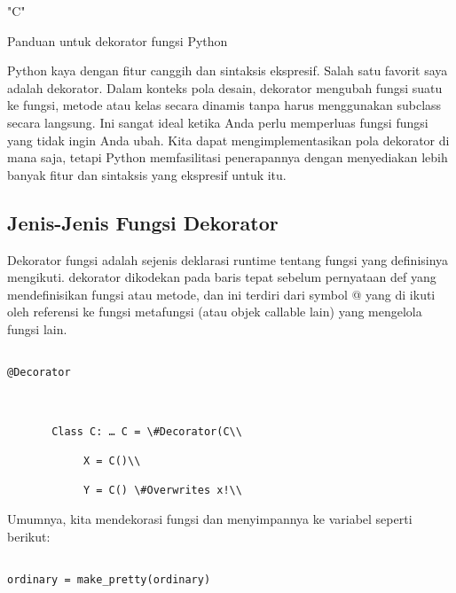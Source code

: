 \documentclass[12pt,a4paper]{article}
\begin{document}
"C"





Panduan untuk dekorator fungsi Python

Python kaya dengan fitur canggih dan sintaksis ekspresif. Salah satu favorit saya adalah dekorator. Dalam konteks pola desain, dekorator mengubah fungsi suatu ke fungsi, metode atau kelas secara dinamis tanpa harus menggunakan subclass secara langsung. Ini sangat ideal ketika Anda perlu memperluas fungsi fungsi yang tidak ingin Anda ubah. Kita dapat mengimplementasikan pola dekorator di mana saja, tetapi Python memfasilitasi penerapannya dengan menyediakan lebih banyak fitur dan sintaksis yang ekspresif untuk itu.



\subsection{Jenis-Jenis Fungsi Dekorator}





Dekorator fungsi adalah sejenis deklarasi runtime tentang fungsi yang definisinya mengikuti. dekorator dikodekan pada baris tepat sebelum pernyataan def yang mendefinisikan fungsi atau metode, dan ini terdiri dari symbol @ yang di ikuti oleh referensi ke fungsi metafungsi (atau objek callable lain) yang mengelola fungsi lain.





\begin{verbatim}

@Decorator



       Class C: … C = \#Decorator(C\\

            X = C()\\

            Y = C() \#Overwrites x!\\

\end{verbatim}

            

Umumnya, kita mendekorasi fungsi dan menyimpannya ke variabel seperti berikut:

\begin{verbatim}

ordinary = make_pretty(ordinary)

\end{verbatim}
\end{document}
